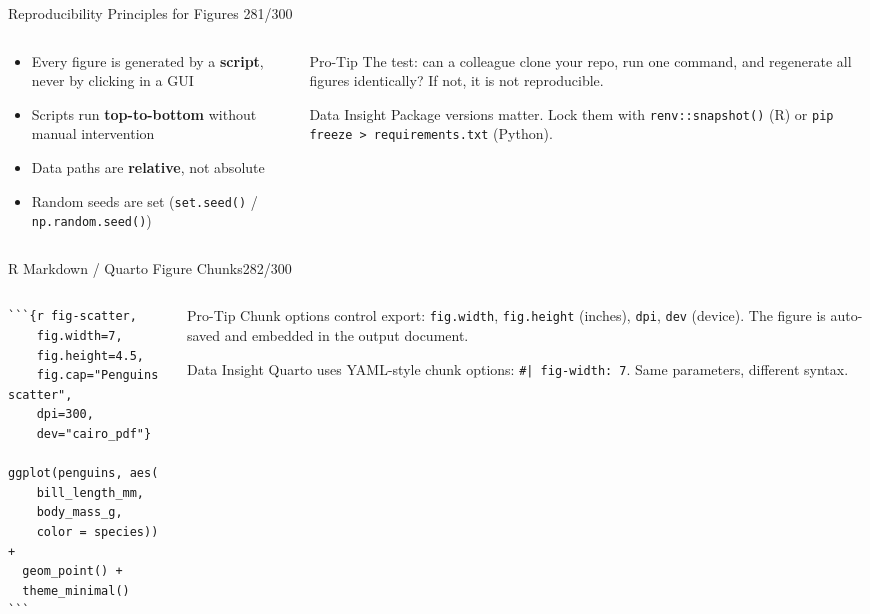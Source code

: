 \documentclass[10pt]{beamer}
\newcommand{\smark}[1]{\hfill{\scriptsize\color{codegray}#1}}
\begin{document}
\begin{frame}{Reproducibility Principles for Figures}
\smark{281/300}
\begin{columns}[T]
\begin{column}{0.50\textwidth}
\begin{itemize}
    \item Every figure is generated by a \textbf{script}, never by clicking in a GUI
    \item Scripts run \textbf{top-to-bottom} without manual intervention
    \item Data paths are \textbf{relative}, not absolute
    \item Random seeds are set (\texttt{set.seed()} / \texttt{np.random.seed()})
\end{itemize}
\end{column}
\begin{column}{0.47\textwidth}
\begin{alertblock}{Pro-Tip}
    \scriptsize The test: can a colleague clone your repo, run one command, and regenerate all figures identically? If not, it is not reproducible.
\end{alertblock}
\vspace{0.2cm}
\begin{exampleblock}{Data Insight}
    \scriptsize Package versions matter. Lock them with \texttt{renv::snapshot()} (R) or \texttt{pip freeze > requirements.txt} (Python).
\end{exampleblock}
\end{column}
\end{columns}
\end{frame}

\begin{frame}[fragile]{R Markdown / Quarto Figure Chunks}\smark{282/300}
\begin{columns}[T]
\begin{column}{0.55\textwidth}
\begin{lstlisting}[style=Rstyle,language={}]
```{r fig-scatter,
    fig.width=7,
    fig.height=4.5,
    fig.cap="Penguins scatter",
    dpi=300,
    dev="cairo_pdf"}

ggplot(penguins, aes(
    bill_length_mm,
    body_mass_g,
    color = species)) +
  geom_point() +
  theme_minimal()
```
\end{lstlisting}
\end{column}
\begin{column}{0.42\textwidth}
\begin{alertblock}{Pro-Tip}
    \scriptsize Chunk options control export: \texttt{fig.width}, \texttt{fig.height} (inches), \texttt{dpi}, \texttt{dev} (device). The figure is auto-saved and embedded in the output document.
\end{alertblock}
\vspace{0.2cm}
\begin{exampleblock}{Data Insight}
    \scriptsize Quarto uses YAML-style chunk options: \texttt{\#| fig-width: 7}. Same parameters, different syntax.
\end{exampleblock}
\end{column}
\end{columns}
\end{frame}
\end{document}
